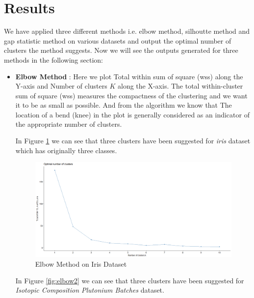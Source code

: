 \section{Results}
We have applied three different methods i.e. elbow method, silhoutte method and gap statistic method on
various datasets and output the optimal number of clusters the method suggests. Now we will see the outputs
generated for three methods in the following section:

\begin{itemize}
\item \textbf{Elbow Method} : Here we plot Total within sum of square (wss) along the Y-axis and
Number of clusters $K$ along the X-axis. The total within-cluster sum of square (wss) measures the compactness
of the clustering and we want it to be as small as possible. And from the algorithm we know that The location
of a bend (knee) in the plot is generally considered as an indicator of the appropriate number of clusters.

\vspace{5mm}

In Figure \ref{fig:elbow1} we can see that three clusters have been suggested for \textit{iris} dataset which
has originally three classes.

\begin{figure}[h!]
  \centering
  \includegraphics[scale=1.3]{figures/results/iris/elbow.png}
  \caption{Elbow Method on Iris Dataset}
  \label{fig:elbow1}
\end{figure}

\newpage

In Figure \ref{fig:elbow2} we can see that three clusters have been suggested for \textit{Isotopic Composition Plutonium Batches}
dataset.


\end{itemize}
